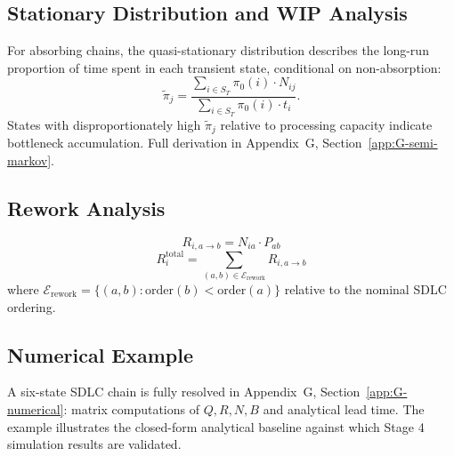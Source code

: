 \subsection{Stationary Distribution and WIP Analysis}
\label{sec:s3-stationary}

For absorbing chains, the quasi-stationary distribution describes the
long-run proportion of time spent in each transient state, conditional on
non-absorption:
\begin{equation}
\label{eq:quasi-stationary}
\tilde{\pi}_j = \frac{\sum_{i \in S_T} \pi_0(i) \cdot N_{ij}}
    {\sum_{i \in S_T} \pi_0(i) \cdot t_i}.
\end{equation}
States with disproportionately high $\tilde{\pi}_j$ relative to processing
capacity indicate bottleneck accumulation. Full derivation in
Appendix~G, Section~\ref{app:G-semi-markov}.


\subsection{Rework Analysis}
\label{sec:s3-rework}

\begin{definition}
\label{def:rework}
\begin{equation}
\label{eq:rework-intensity}
R_{i,a \to b} = N_{ia} \cdot P_{ab}
\end{equation}
\begin{equation}
\label{eq:total-rework}
R_i^{\text{total}} = \sum_{(a,b) \in \mathcal{E}_{\text{rework}}} R_{i,a \to b}
\end{equation}
where $\mathcal{E}_{\text{rework}} = \{(a, b) : \text{order}(b) < \text{order}(a)\}$
relative to the nominal SDLC ordering.
\end{definition}


\subsection{Numerical Example}
\label{sec:s3-example}

A six-state SDLC chain is fully resolved in Appendix~G,
Section~\ref{app:G-numerical}: matrix computations of $Q, R, N, B$ and
analytical lead time. The example illustrates the closed-form analytical
baseline against which Stage 4 simulation results are validated.


